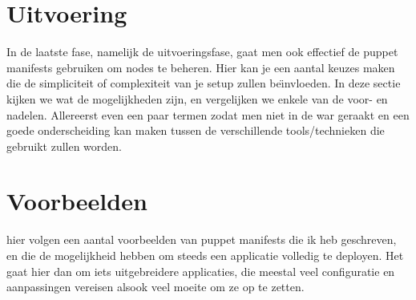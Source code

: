 \section{Uitvoering}
In de laatste fase, namelijk de uitvoeringsfase, gaat men ook effectief de puppet manifests gebruiken om nodes te beheren. Hier kan je een aantal keuzes maken die de simpliciteit of complexiteit van je setup zullen be\"{\i}nvloeden. In deze sectie kijken we wat de mogelijkheden zijn, en vergelijken we enkele van de voor- en nadelen.
Allereerst even een paar termen zodat men niet in de war geraakt en een goede onderscheiding kan maken tussen de verschillende tools/technieken die gebruikt zullen worden.
 
\section{Voorbeelden}
hier volgen een aantal voorbeelden van puppet manifests die ik heb geschreven, en die de mogelijkheid hebben om steeds een applicatie volledig te deployen. Het gaat hier dan om iets uitgebreidere applicaties, die meestal veel configuratie en aanpassingen vereisen alsook veel moeite om ze op te zetten.
